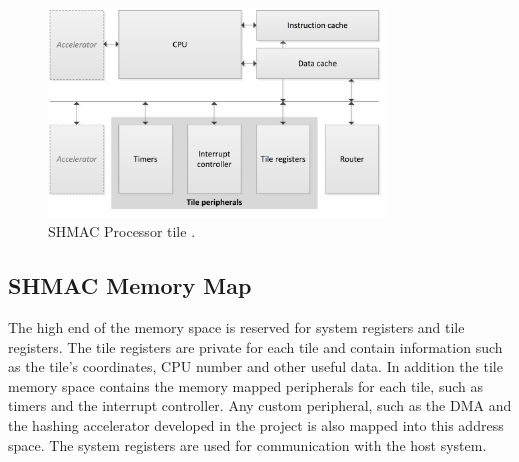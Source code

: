 \begin{figure}[htb]
    \centering
    \includegraphics[width=0.8\textwidth]{Figures/Heterogeneous/SHMACCPU}
    \caption{SHMAC Processor tile \cite{shmac-plan}.}
    \label{fig:shmac-cpu}
\end{figure}

\subsection{SHMAC Memory Map}

%
%
The high end of the memory space is reserved for system registers and tile registers. 
The tile registers are private for each tile and contain information such as the tile's coordinates, CPU number and other useful data.
In addition the tile memory space contains the memory mapped peripherals for each tile, such as timers and the interrupt controller.
Any custom peripheral, such as the DMA and the hashing accelerator developed in the project is also mapped into this address space.
The system registers are used for communication with the host system.


